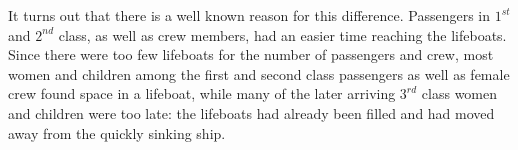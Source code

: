 \documentclass[a4paper]{report}
\begin{document}
\begin{article}




It turns out that there is a well known reason for this difference.
Passengers in $1^{st}$ and $2^{nd}$ class, as well as crew members, had an
easier time reaching the lifeboats.  Since there were too few
lifeboats for the number of passengers and crew, most women and
children among the first and second class passengers as well as
female crew found space in a lifeboat, while many of the later
arriving $3^{rd}$  class women and children were too late: the lifeboats
had already been filled and had moved away from the quickly sinking
ship.


\end{article}
\end{document}
